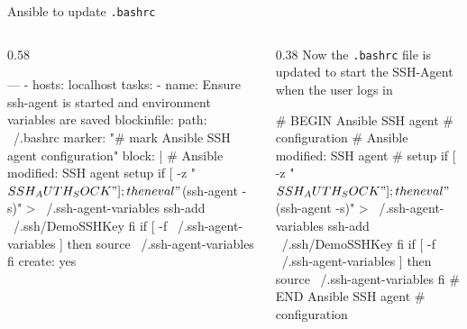 \documentclass[aspectratio=169,12pt]{beamer}
\begin{document}
\begin{frame}[fragile]{Ansible to update \texttt{.bashrc}}
\begin{columns}[T]
\begin{column}{0.58\textwidth}
\begin{codeyamlsmall}
---
- hosts: localhost
  tasks:
    - name: Ensure ssh-agent is started
        and environment variables are saved
      blockinfile:
        path: ~/.bashrc
        marker: "# {mark} Ansible SSH
          agent configuration"
        block: |
          # Ansible modified: SSH agent setup
          if [ -z "$SSH_AUTH_SOCK" ]; then
            eval "$(ssh-agent -s)" >
              ~/.ssh-agent-variables
            ssh-add ~/.ssh/DemoSSHKey
          fi
          if [ -f ~/.ssh-agent-variables ]
          then
            source ~/.ssh-agent-variables
          fi
        create: yes
\end{codeyamlsmall}
\end{column}
\begin{column}{0.38\textwidth}
Now the \texttt{.bashrc} file is updated to start the SSH-Agent when the user logs in
\vspace{0.3cm}
\begin{codebashsmall}
# BEGIN Ansible SSH agent
#   configuration
# Ansible modified: SSH agent
#   setup
if [ -z "$SSH_AUTH_SOCK" ]; then
    eval "$(ssh-agent -s)" >
      ~/.ssh-agent-variables
    ssh-add ~/.ssh/DemoSSHKey
fi
if [ -f ~/.ssh-agent-variables ]
then
    source ~/.ssh-agent-variables
fi
# END Ansible SSH agent
#   configuration
\end{codebashsmall}
\end{column}
\end{columns}
\end{frame}
\end{document}
